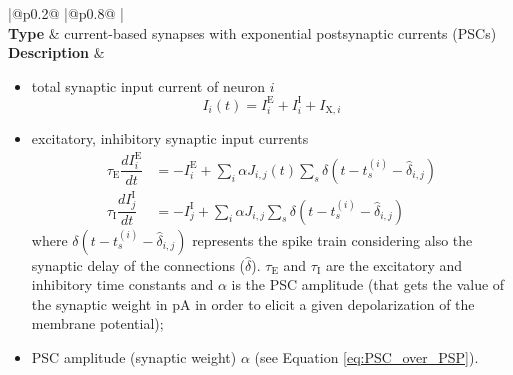 \documentclass[a4paper, 12pt, twoside, openright]{book}
\newcommand{\exc}{\text{E}}     %
\newcommand{\ext}{\text{X}}   %
\newcommand{\inh}{\text{I}}     %
\def\marg{2pt}
\begin{document}
\begin{table}[H]
\begin{tabular}{
  |@{\hspace*{\marg}}p{}@{\hspace*{\marg}}
  |@{\hspace*{\marg}}p{}@{\hspace*{\marg}}
  |}
  \hline 
  \\
  \hline 
  \textbf{Type} & current-based synapses with exponential postsynaptic currents (PSCs)\\
  \hline 
  \textbf{Description} &
                         \begin{itemize}
                         \item total synaptic input current of neuron $i$
                         \begin{equation*}
                           I_i(t)=I_{i}^{\exc}+I_{i}^{\inh} + I_{\ext,i}
                         \end{equation*}
                       \item excitatory, inhibitory synaptic input currents
                         \begin{equation*}
                            \begin{aligned}
                              \tau_{\exc}\dfrac{d I_{i}^{\exc}}{dt} &= - I_{i}^{\exc} + \sum_i \alpha J_{i,j}(t) \sum_s \delta (t-t_s ^{(i)}-\hat{\delta}_{i,j})\\
                              \tau_{\inh}\dfrac{d I_{j}^{\inh}}{dt} &= - I_{j}^{\inh} + \sum_i \alpha J_{i,j} \sum_s \delta (t-t_s ^{(i)}-\hat{\delta}_{i,j})
                            \end{aligned}
                          \end{equation*}
                          where $\delta (t-t_s ^{(i)}-\hat{\delta}_{i,j})$ represents the spike train considering also the synaptic delay of the connections ($\hat{\delta}$). $\tau_{\exc}$ and $\tau_{\inh}$ are the excitatory and inhibitory time constants and $\alpha$ is the PSC amplitude (that gets the value of the synaptic weight in pA in order to elicit a given depolarization of the membrane potential);
                        \item PSC amplitude (synaptic weight) $\alpha$ (see Equation \eqref{eq:PSC_over_PSP}).
                         \end{itemize}                        
  \\
  \hline 
\end{tabular}
\caption{Description of the network model (continues on next page).}
\end{table}
\end{document}
